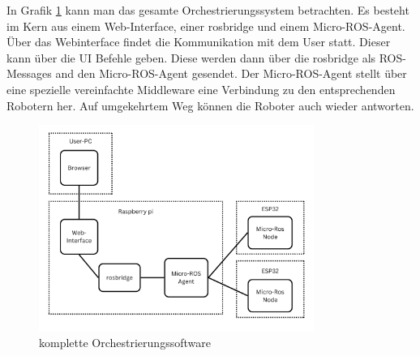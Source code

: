\begin{flushleft}

    In Grafik \ref{fig:orchestration_system} kann man das gesamte Orchestrierungssystem betrachten.
    Es besteht im Kern aus einem Web-Interface, einer rosbridge und einem Micro-ROS-Agent.
    Über das Webinterface findet die Kommunikation mit dem User statt. Dieser kann über die UI Befehle geben.
    Diese werden dann über die rosbridge als ROS-Messages and den Micro-ROS-Agent gesendet.
    Der Micro-ROS-Agent stellt über eine spezielle vereinfachte Middleware eine Verbindung zu den entsprechenden Robotern her.
    Auf umgekehrtem Weg können die Roboter auch wieder antworten.

    \begin{figure}[h!]
        \centering
        \includegraphics[width=0.8\textwidth]{imgs/Full_system_graph.png}
        \caption{komplette Orchestrierungssoftware}
        \label{fig:orchestration_system}%
    \end{figure}





\end{flushleft}
